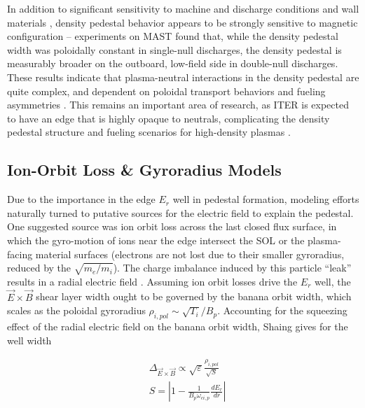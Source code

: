 In addition to significant sensitivity to machine and discharge conditions and wall materials \cite{Beurskens2011}, density pedestal behavior appears to be strongly sensitive to magnetic configuration -- experiments on MAST \cite{Maggi2010} found that, while the density pedestal width was poloidally constant in single-null discharges, the density pedestal is measurably broader on the outboard, low-field side in double-null discharges.  These results indicate that plasma-neutral interactions in the density pedestal are quite complex, and dependent on poloidal transport behaviors and fueling asymmetries \cite{Maggi2010}.  This remains an important area of research, as ITER is expected to have an edge that is highly opaque to neutrals, complicating the density pedestal structure and fueling scenarios for high-density plasmas \cite{Hughes2007,Maggi2010}.

\subsection{Ion-Orbit Loss \& Gyroradius Models}\label{subsec:mod_ionorbitloss}

Due to the importance in the edge $E_r$ well in pedestal formation, modeling efforts naturally turned to putative sources for the electric field to explain the pedestal.  One suggested source was ion orbit loss across the last closed flux surface, in which the gyro-motion of ions near the edge intersect the SOL or the plasma-facing material surfaces (electrons are not lost due to their smaller gyroradius, reduced by the $\sqrt{m_e/m_i}$).  The charge imbalance induced by this particle ``leak'' results in a radial electric field \cite{Shaing1990}.  Assuming ion orbit losses drive the $E_r$ well, the $\vec{E}\times\vec{B}$ shear layer width ought to be governed by the banana orbit width, which scales as the poloidal gyroradius $\rho_{i,pol} \sim \sqrt{T_i}/B_p$.  Accounting for the squeezing effect of the radial electric field on the banana orbit width, Shaing \cite{Shaing1992} gives for the well width

\begin{equation}\label{eq:Shaing_width}
 \begin{aligned}
  &\Delta_{\vec{E}\times\vec{B}} \propto \sqrt{\varepsilon} \frac{\rho_{i,pol}}{\sqrt{S}}\\
  &S = \left| 1 - \frac{1}{B_p \omega_{ci,p}} \frac{dE_r}{dr}\right|
 \end{aligned}
\end{equation}

